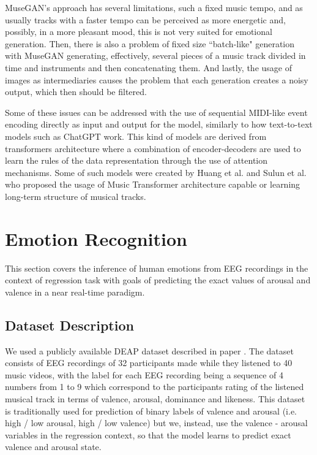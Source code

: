 \documentclass[14pt]{extreport}
\begin{document}
MuseGAN's approach has several limitations, such a fixed music tempo, and as usually tracks with a faster tempo can be perceived as more energetic and, possibly, in a more pleasant mood, this is not very suited for emotional generation. Then, there is also a problem of fixed size ``batch-like" generation with MuseGAN generating, effectively, several pieces of a music track divided in time and instruments and then concatenating them. And lastly, the usage of images as intermediaries causes the problem that each generation creates a noisy output, which then should be filtered.

Some of these issues can be addressed with the use of sequential MIDI-like event encoding directly as input and output for the model, similarly to how text-to-text models such as ChatGPT work. This kind of models are derived from transformers architecture where a combination of encoder-decoders are used to learn the rules of the data representation through the use of attention mechanisms. Some of such models were created by Huang et al. \cite{huang} and Sulun et al. \cite{sulun} who proposed the usage of Music Transformer architecture capable or learning long-term structure of musical tracks.

\section{Emotion Recognition}
This section covers the inference of human emotions from EEG recordings in the context of regression task with goals of predicting the exact values of \gls{arousal} and \gls{valence} in a near real-time paradigm.

\subsection{Dataset Description}

We used a publicly available DEAP dataset described in paper \cite{deap}. The dataset consists of EEG recordings of 32 participants made while they listened to 40 music videos, with the label for each EEG recording being a sequence of 4 numbers from 1 to 9 which correspond to the participants rating of the listened musical track in terms of \gls{valence}, \gls{arousal}, dominance and likeness. This dataset is traditionally used for prediction of binary labels of \gls{valence} and \gls{arousal} (i.e. high / low arousal, high / low valence) but we, instead, use the \gls{valence} - \gls{arousal} variables in the regression context, so that the model learns to predict exact \gls{valence} and \gls{arousal} state.
\end{document}
